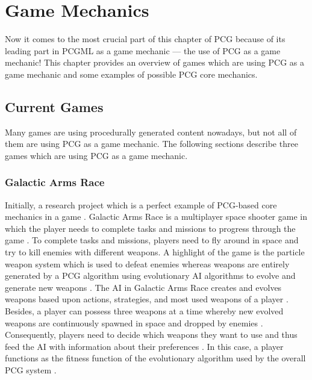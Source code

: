 \documentclass[MGS,Master,english]{twbook}%
\begin{document}
\section{Game Mechanics}
Now it comes to the most crucial part of this chapter of \ac{PCG} because of its leading part in \ac{PCGML} as a game mechanic — the use of \ac{PCG} as a game mechanic! This chapter provides an overview of games which are using \ac{PCG} as a game mechanic and some examples of possible \ac{PCG} core mechanics.

\subsection{Current Games} \label{pcgMechanicGames}
Many games are using procedurally generated content nowadays, but not all of them are using \ac{PCG} as a game mechanic. The following sections describe three games which are using \ac{PCG} as a game mechanic.

\subsubsection{Galactic Arms Race}
Initially, a research project which is a perfect example of \ac{PCG}-based core mechanics in a game \cite{game::galacticArmsRace}. Galactic Arms Race is a multiplayer space shooter game in which the player needs to complete tasks and missions to progress through the game \cite{game::galacticArmsRace}. To complete tasks and missions, players need to fly around in space and try to kill enemies with different weapons. A highlight of the game is the particle weapon system which is used to defeat enemies whereas weapons are entirely generated by a \ac{PCG} algorithm using evolutionary \ac{AI} algorithms to evolve and generate new weapons \cite{pcg::galacticArmsRace}. The \ac{AI} in Galactic Arms Race creates and evolves weapons based upon actions, strategies, and most used weapons of a player \cite{pcg::galacticArmsRace} \cite{pcg::galacticArmsRace::evolvingContent}. Besides, a player can possess three weapons at a time whereby new evolved weapons are continuously spawned in space and dropped by enemies \cite{pcg::galacticArmsRace::evolvingContent}. Consequently, players need to decide which weapons they want to use and thus feed the \ac{AI} with information about their preferences \cite{pcg::galacticArmsRace::evolvingContent}. In this case, a player functions as the fitness function of the evolutionary algorithm used by the overall \ac{PCG} system \cite{pcg::galacticArmsRace::evolvingContent}.
\end{document}
